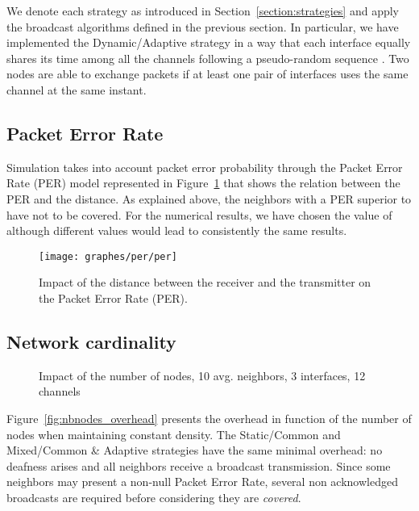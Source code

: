 \documentclass[twoside]{article}
\begin{document}
{We denote each strategy as introduced in Section~\ref{section:strategies} and apply the broadcast algorithms defined in the previous section.
In particular, we have implemented the Dynamic/Adaptive strategy in a way
that each interface equally shares its time among all the channels following a pseudo-random sequence \cite{bahl04}. 
Two nodes are able to exchange packets if at least one pair of interfaces uses the same channel at the same instant.


\subsection{Packet Error Rate}

Simulation takes into account packet error probability through the Packet Error
Rate (PER) model represented in Figure~\ref{fig:per}  
\cite{camp06} that shows the relation between the PER and the distance.
As explained above, the neighbors with a PER superior to  have not
to be covered. 
For the numerical results, we have chosen the value of  although different values would lead to consistently the same results.





\begin{figure}
\centering
	\texttt{[image: graphes/per/per]}
 	\caption{Impact of the distance between the receiver and the transmitter on the Packet Error Rate (PER).}
	\label{fig:per}
\end{figure}





\subsection{Network cardinality}

\begin{figure}[t!]
\begin{center}
	\caption{Impact of the number of nodes, 10 avg. neighbors, 3 interfaces, 12 channels}
\end{center}
\end{figure}



Figure~\ref{fig:nbnodes_overhead} presents the overhead in function of the number
of nodes when maintaining constant density. 
The Static/Common and Mixed/Common \& Adaptive strategies have the same minimal
overhead: no deafness arises and all neighbors receive a broadcast transmission. 
Since some neighbors may present a non-null Packet Error Rate, several non acknowledged broadcasts are required before considering they are \emph{covered}. 



}
\end{document}
